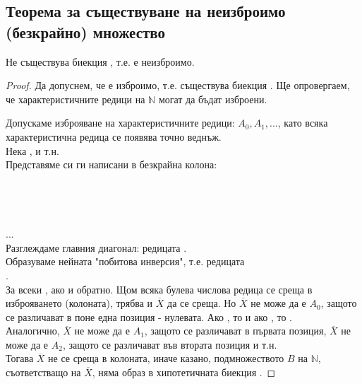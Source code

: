 \subsection*{Теорема за съществуване на неизброимо (безкрайно) множество}
\begin{theorem}
    Не съществува биекция , т.е.  е неизброимо.
\end{theorem}
\begin{proof}
    Да допуснем, че  е изброимо, т.е. съществува биекция 
    .
    Ще опровергаем, че характеристичните редици на \(\mathbb{N}\) могат да бъдат изброени.

    Допускаме изброяване на характеристичните редици: \(A_0, A_1, ...\), като всяка характеристична 
    редица се появява точно веднъж. \\
    Нека ,  и т.н. \\
    Представяме си ги написани в безкрайна колона: \\
     \\
     \\
     \\
     \\
    ... \\
    Разглеждаме главния диагонал: редицата . \\
    Образуваме нейната "побитова инверсия", т.е. редицата \\
    . \\
    За всеки , ако  и обратно.
    Щом всяка булева числова редица се среща в изброяването (колоната), трябва и \(\overline{X}\) да 
    се среща. Но \(\overline{X}\) не може да е \(A_0\), защото се различават в поне една позиция - нулевата.
    Ако , то  и ако , 
    то . \\
    Аналогично, \(\overline{X}\) не може да е \(A_1\), защото се различават в първата позиция, 
    \(\overline{X}\) не може да е \(A_2\), защото се различават във втората позиция и т.н. \\
    Тогава \(\overline{X}\) не се среща в колоната, иначе казано, подмножеството \(B\) на \(\mathbb{N}\),
    съответстващо на \(\overline{X}\), няма образ в хипотетичната биекция .
\end{proof}

